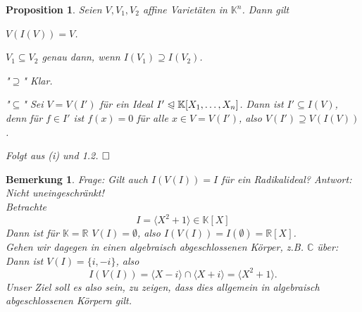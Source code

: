 \documentclass[11pt]{book}
\newtheorem{prop}[theorem]{Proposition}
\newtheorem{remark}[theorem]{Bemerkung}
\theoremstyle{nonumberbreak}
\newenvironment{pr}[1][]{\ifthenelse{\equal{#1}{}}{\proof}{\proof[#1]}\rm}{\endproof}
\newenvironment{definbem}[1][]{\ifthenelse{\equal{#1}{}}{\definibem}{\definibem[#1]}\rm}{\enddefinibem}
\begin{document}
\begin{spacing}{1.3}
\begin{prop} %
Seien $V, V_1, V_2$ affine Varietäten in $\mathbb{K}^n$. Dann gilt
\begin{compactenum}
\item $V(I(V))=V$.
\item $V_1 \subseteq V_2$ genau dann, wenn $I(V_1) \supseteq I(V_2)$.
\end{compactenum}
\begin{pr}
\begin{compactenum}
\item \begin{compactitem}
\item["$\supseteq$"] Klar.
\item["$\subseteq$"] Sei $V=V(I')$ für ein Ideal $I' \trianglelefteqslant \mathbb{K}[X_1, \ldots, X_n]$.  Dann ist $I' \subseteq I(V)$, denn für $f \in I'$ ist $f(x)=0$ für alle $x \in V=V(I')$, also $V(I') \supseteq V(I(V))$.
\end{compactitem}
\item Folgt aus (i) und 1.2. $\hfill \Box$
\end{compactenum}
\end{pr}
\end{prop}

\begin{remark} %

Frage: Gilt auch $I(V(I))=I$ für ein Radikalideal? Antwort: Nicht uneingeschränkt!\\
Betrachte $$I= \langle X^2+1 \rangle \in \mathbb{K}[X]$$Dann ist für $\mathbb{K}=\mathbb{R}$ $V(I)= \emptyset$, also $I(V(I))=I(\emptyset)=\mathbb{R}[X]$.\\
Gehen wir dagegen in einen algebraisch abgeschlossenen Körper, z.B. $\mathbb{C}$ über:\\
Dann ist $V(I)=\{i,-i\}$, also $$I(V(I))=\langle X-i\rangle \cap \langle X+i \rangle = \langle X^2+1\rangle.$$
Unser Ziel soll es also sein, zu zeigen, dass dies allgemein in algebraisch abgeschlossenen Körpern gilt.
\end{remark}

\begin{definbem} %


\end{definbem}
\end{spacing}
\end{document}

